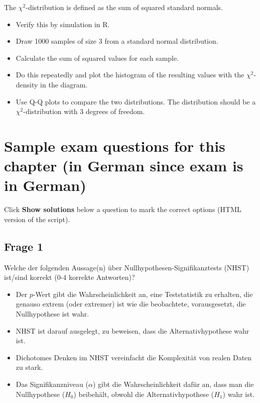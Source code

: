 \documentclass[
]{book}
\providecommand{\tightlist}{%
  \setlength{\itemsep}{0pt}\setlength{\parskip}{0pt}}
\begin{document}
The \(\chi^2\)-distribution is defined as the sum of squared standard normals.

\begin{itemize}
\tightlist
\item
  Verify this by simulation in R.
\item
  Draw 1000 samples of size 3 from a standard normal distribution.
\item
  Calculate the sum of squared values for each sample.
\item
  Do this repeatedly and plot the histogram of the resulting values with the \(\chi^2\)-density in the diagram.
\item
  Use Q-Q plots to compare the two distributions. The distribution should be a \(\chi^2\)-distribution with 3 degrees of freedom.
\end{itemize}

\section{Sample exam questions for this chapter (in German since exam is in German)}\label{sample-exam-questions-for-this-chapter-in-german-since-exam-is-in-german-3}

Click \textbf{Show solutions} below a question to mark the correct options (HTML version of the script).

\subsection{Frage 1}\label{frage-1-1}

Welche der folgenden Aussage(n) über Nullhypothesen-Signifikanztests (NHST) ist/sind korrekt (0-4 korrekte Antworten)?

\begin{itemize}
\tightlist
\item
  Der \(p\)-Wert gibt die Wahrscheinlichkeit an, eine Teststatistik zu erhalten,
  die genauso extrem (oder extremer) ist wie die beobachtete, vorausgesetzt, die Nullhypothese ist wahr.
\item
  NHST ist darauf ausgelegt, zu beweisen, dass die Alternativhypothese wahr ist.
\item
  Dichotomes Denken im NHST vereinfacht die Komplexität von realen Daten zu stark.
\item
  Das Signifikanzniveau (\(\alpha\)) gibt die Wahrscheinlichkeit dafür an, dass man die
  Nullhypothese (\(H_0\)) beibehält, obwohl die Alternativhypothese (\(H_1\)) wahr ist.
\end{itemize}
\end{document}
